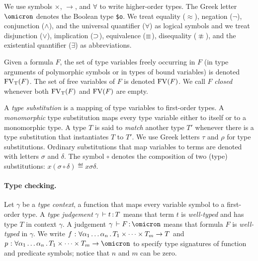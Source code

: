 We use symbols ${\times}$, ${\to}$, and ${\forall}$
to write higher-order types. The Greek letter $\omicron$ denotes
the Boolean type {\tt \$o}. We treat equality ($\approx$),
negation ($\lnot$), conjunction ($\land$), and the universal
quantifier ($\forall$) as logical symbols and we treat
disjunction ($\lor$), implication ($\supset$), equivalence
($\equiv$), disequality ($\not\approx$), and the existential
quantifier ($\exists$) as abbreviations.

Given a formula $F$, the set of type variables
freely occurring in $F$ (in type arguments of
polymorphic symbols or in types of bound variables)
is denoted $\mathrm{FV}_\mathrm{T}(F)$. The set of free variables of $F$
is denoted $\mathrm{FV}(F)$. We call $F$ {\em closed\/}
whenever both $\mathrm{FV}_\mathrm{T}(F)$ and $\mathrm{FV}(F)$ are empty.

A {\em type substitution\/} is a mapping of type variables
to first-order types. A {\em monomorphic\/} type substitution
maps every type variable either to itself or to a monomorphic type.
%
A type $T$ is said to {\em match\/} another type $T'$ whenever
there is a type substitution that instantiates $T$ to $T'$.
We use Greek letters $\tau$ and $\rho$ for type substitutions.
%
Ordinary substitutions that map variables to terms
are denoted with letters $\sigma$ and $\delta$.
The symbol $\circ$ denotes the composition
of two (type) substitutions:
$x(\sigma \circ \delta) \eqdef x\sigma\delta$.

\paragraph{Type checking.}
Let $\gamma$ be a {\em type context}, a function that maps
every variable symbol to a first-order type.
A {\em type judgement\/} $\gamma \,\vdash t \operatorname{:} T$ means that term $t$
is {\em well-typed\/} and has type $T$ in context $\gamma$.
A judgement $\gamma \,\vdash F \ty \omicron$ means that formula $F$
is {\em well-typed\/} in $\gamma$.
We write $f \,\operatorname{:}\, \forall \alpha_1\dots\alpha_n \,.\,
T_1 \times \dots \times T_m \to T$ and
$p \,\ty\, \forall \alpha_1\dots\alpha_n \,.\,
T_1 \times \dots \times T_m \to \omicron$ to specify
type signatures of function and predicate symbols;
notice that $n$ and $m$ can be zero.


